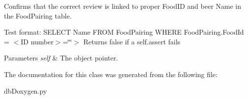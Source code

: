 Confirms that the correct review is linked to proper Food\-I\-D and beer Name in the Food\-Pairing table. 

Test format\-: S\-E\-L\-E\-C\-T Name F\-R\-O\-M Food\-Pairing W\-H\-E\-R\-E Food\-Pairing.\-Food\-Id = $<$\-I\-D number$>$=\char`\"{}\char`\"{}$>$  Returns false if a self.\-assert fails 
\begin{DoxyParams}{Parameters}
{\em self} & The object pointer. \\
\hline
\end{DoxyParams}


The documentation for this class was generated from the following file\-:\begin{DoxyCompactItemize}
\item 
db\-Doxygen.\-py\end{DoxyCompactItemize}
